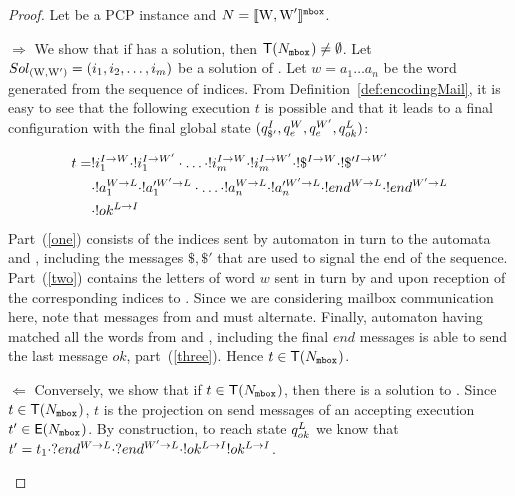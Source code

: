 \begin{proof}
Let \pcpinstance{} be a PCP instance and $N  = \llbracket \mathcal{\text{W},\text{W}'} \rrbracket ^{\mathtt{mbox}}$.
\begin{compactdesc}
\item[$\Rightarrow$] We show that if \pcpinstance{} has a solution, then 
 $\mathsf{T}(N_{{\mathtt{mbox}}^{}})  \neq \emptyset$.
 Let $Sol_{(\text{W}, \text{W}'){}} = (i_1, i_2, \ldots ,  i_m)$ be a solution of \pcpinstance{}.
 Let $w= a_1 \dots a_n$ be the word generated from the sequence of indices.
 From Definition~\ref{def:encodingMail}, it is easy to see that the following execution $t$ is possible and that it leads to a final configuration with the final global state $({q}_{\$'}^{I}, {q}_{e}^{W},{q}_{e}^{W'}, {q}_{ok}^{L})$:

\begin{align}
t = & !i_1^{I \rightarrow W} \cdot !i_1^{I \rightarrow W'}\cdot 
\ldots \cdot 
!i_m^{I \rightarrow W}\cdot !i_m^{I \rightarrow W'}
\cdot
!\$^{I \rightarrow W}\cdot !\$'^{I \rightarrow W'} \label{one}\\
&\cdot
!a_1^{W \rightarrow L}\cdot !a_1'^{W' \rightarrow L}
\cdot \ldots \cdot 
!a_n^{W \rightarrow L}\cdot !a_n'^{W' \rightarrow L}
\cdot
!end^{W \rightarrow L}\cdot !end^{W' \rightarrow L} \label{two}\\
&\cdot 
!ok^{L \rightarrow I} \label{three}
\end{align}
Part~(\ref{one}) consists of the indices sent by automaton 
 in turn to the automata  and , including the messages $\$, \$'$ that are used to signal the end of the sequence.
Part~(\ref{two}) contains the letters of word $w$ sent in turn by  
 and  upon reception of the corresponding indices to . Since we are considering mailbox communication here, note that messages from  and  must alternate.  
Finally, automaton  having matched all the words from  and , including the final $end$ messages is able to send the last message $ok$, part~(\ref{three}).
Hence  $t \in \mathsf{T}(N_{{\mathtt{mbox}}^{}})$.
\item[$\Leftarrow$] 
Conversely, we show that if $t \in \mathsf{T}(N_{{\mathtt{mbox}}^{}})$, then there is a solution to \pcpinstance{}.
Since $t \in \mathsf{T}(N_{{\mathtt{mbox}}^{}})$, $t$ is the projection on send messages of an accepting execution $t' \in \mathsf{E}(N_{{\mathtt{mbox}}^{}})$.
By construction, to reach state ${q}_{ok}^{L}$ 
 we know that $t' = t_1 \cdot ?end^{W \rightarrow L}\cdot ?end^{W' \rightarrow L} \cdot !ok^{L \rightarrow I} !ok^{L \rightarrow I}$. 

\end{compactdesc}
\end{proof}
